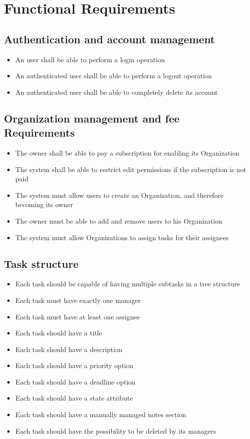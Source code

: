 \documentclass{article}
\begin{document}
\section{Functional Requirements}
\subsection{Authentication and account management}
\begin{itemize}
    \item An user shall be able to perform a login operation
    \item An authenticated user shall be able to perform a logout operation
    \item An authenticated user shall be able to completely delete its account
\end{itemize}
\subsection{Organization management and fee Requirements}
\begin{itemize}
    \item The owner shall be able to pay a subscription for enabling its Organization
    \item The system shall be able to restrict edit permissions if the subscription is not paid
    \item The system must allow users to create an Organization, and therefore becoming its owner
    \item The owner must be able to add and remove users to his Organization
    \item The system must allow Organizations to assign tasks for their assignees
\end{itemize}
\subsection{Task structure}
\begin{itemize}
    \item Each task should be capable of having multiple subtasks in a tree structure
    \item Each task must have exactly one manager
    \item Each task must have at least one assignee
    \item Each task should have a title
    \item Each task should have a description
    \item Each task should have a priority option
    \item Each task should have a deadline option
    \item Each task should have a state attribute
    \item Each task should have a manually managed notes section
    \item Each task should have the possibility to be deleted by its managers
\end{itemize}
\end{document}
